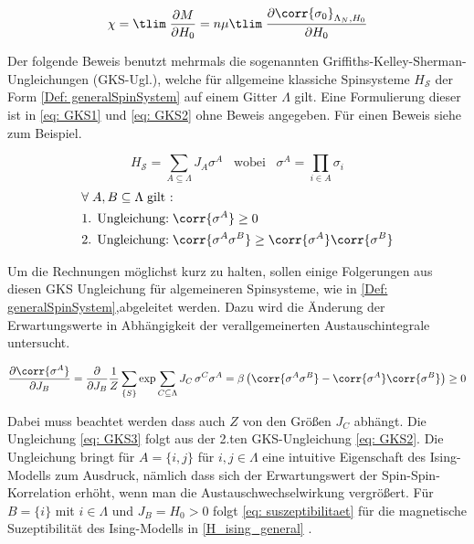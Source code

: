 \begin{equation} \label{def: suszeptibilitaet}
\chi = \tlim\; \frac{\partial M}{\partial H_0} = n \mu \tlim\; \frac{\partial \corr{\sigma_0}_{\Lambda_N, H_0}}{\partial H_0} 
\end{equation}

\noindent Der folgende Beweis benutzt mehrmals die sogenannten Griffiths-Kelley-Sherman-Ungleichungen (GKS-Ugl.), welche für allgemeine klassiche Spinsysteme $H_{\mathcal{S}}$ der Form \eqref{Def: generalSpinSystem} auf einem Gitter $\Lambda$ gilt. Eine Formulierung dieser ist in \eqref{eq: GKS1} und \eqref{eq: GKS2} ohne Beweis angegeben. Für einen Beweis siehe zum Beispiel.

\begin{grayframe}[frametitle = {Griffiths-Kelley-Sherman-Ungelichungen}]
\begin{equation}\label{Def: generalSpinSystem} 
H_{\mathcal{S}}  = \sum_{A \subseteq \Lambda} J_A \sigma^A \;\;\;\text{wobei}\;\;\; \sigma^A = \prod_{i \in A} \sigma_i
\end{equation}
\begin{align}
&\forall\; A,B \subseteq \Lambda \;\text{gilt : }  \\
&\text{1. Ungleichung:}\;   \corr{\sigma^A}    \geq 0  \label{eq: GKS1}\\
&\text{2. Ungleichung:}\;   \corr{\sigma^A \sigma^B}\geq \corr{\sigma^A}\corr{\sigma^B} \label{eq: GKS2}\\
\end{align}
\end{grayframe}

\noindent Um die Rechnungen möglichst kurz zu halten, sollen einige Folgerungen aus diesen GKS Ungleichung für algemeineren Spinsysteme, wie in \eqref{Def: generalSpinSystem},abgeleitet werden. Dazu wird die Änderung der Erwartungswerte in Abhängigkeit der verallgemeinerten Austauschintegrale untersucht.

\begin{equation}
\frac{\partial \corr{\sigma^A}}{\partial J_B} = \frac{\partial }{\partial J_B} \frac{1}{Z} \sum_{\{S\}} \exp{\sum_{C \subseteq \Lambda} J_C\, \sigma^C } \sigma^A = \beta \left(\corr{\sigma^A \sigma^B} - \corr{\sigma^A }\corr{\sigma^B} \right) \geq 0 \label{eq: GKS3}
\end{equation}

\noindent Dabei muss beachtet werden dass auch $Z$ von den Größen $J_C$ abhängt. Die Ungleichung \eqref{eq: GKS3} folgt aus der 2.ten GKS-Ungleichung \eqref{eq: GKS2}. Die Ungleichung bringt für $A=\{i,j \}$ für $i,j \in \Lambda$ eine intuitive Eigenschaft des Ising-Modells zum Ausdruck, nämlich dass sich der Erwartungswert der Spin-Spin-Korrelation erhöht, wenn man die Austauschwechselwirkung vergrößert. Für $B =  \{ i \} $ mit $i \in \Lambda$ und $ J_B = H_0 > 0$ folgt \eqref{eq:  suszeptibilitaet} für die magnetische Suzeptibilität des Ising-Modells in \eqref{H_ising_general} .  

